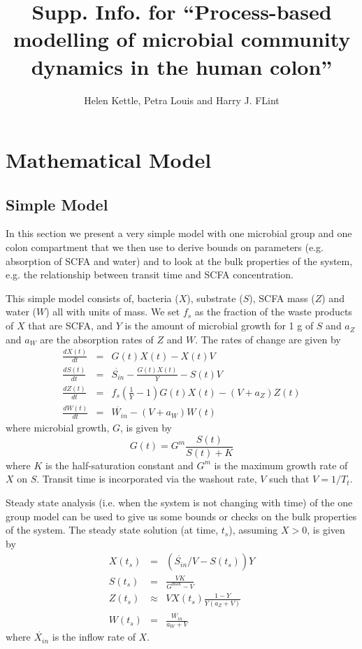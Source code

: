 \documentclass[a4paper]{article}
\begin{document}
\title{Supp. Info. for ``Process-based modelling of microbial community dynamics in the human colon''}

\author{Helen Kettle, Petra Louis and Harry J. FLint}

\maketitle

\linenumbers

\section{Mathematical Model}
\subsection{Simple Model}
In this section we present a very simple model with one microbial group and one colon compartment that we then use to derive bounds on parameters (e.g. absorption of SCFA and water) and to look at the bulk properties of the system, e.g. the relationship between transit time and SCFA concentration.

This simple model consists of, bacteria ($X$), substrate ($S$), SCFA mass ($Z$) and water ($W$) all with units of mass. We set $f_s$ as the fraction of the waste products of $X$ that are SCFA, and $Y$ is the amount of microbial growth for 1 g of $S$ and $a_Z$ and $a_W$ are the absorption rates of $Z$ and $W$.
The rates of change are given by
\begin{eqnarray}
\frac{dX(t)}{dt}&=&G(t)X(t)-X(t)V\\\label{eq:TtSSB}
\frac{dS(t)}{dt}&=&\dot{S_{in}}-\frac{G(t)X(t)}{Y}-S(t)V\\
\frac{dZ(t)}{dt}&=&f_s\left(\frac{1}{Y}-1\right)G(t)X(t)-(V+a_Z)Z(t)\\
\frac{dW(t)}{dt}&=&\dot{W_{in}}-(V+a_W)W(t)\label{eq:TtSSW}
\end{eqnarray}
where microbial growth, $G$, is given by
\begin{equation}
G(t)=G^m\frac{S(t)}{S(t)+K}
\end{equation}
where $K$ is the half-saturation constant and $G^m$ is the maximum growth rate of $X$ on $S$.
Transit time is incorporated via the washout rate, $V$ such that $V=1/T_t$.

Steady state analysis (i.e. when the system is not changing with time) of the one group model can be used to give us some bounds or checks on the bulk properties of the system. 
The steady state solution (at time, $t_s$), assuming $X>0$, is given by 
\begin{eqnarray}
X(t_s)&=&(\dot{S_{in}}/V-S(t_s))Y\\
S(t_s)&=&\frac{VK}{G^{\max}-V}\\
Z(t_s)&\approx & VX(t_s)\frac{1-Y}{Y(a_Z+V)}\\
W(t_s)&=&\frac{\dot{W_{in}}}{a_W+V}\label{eq:Wss1}
\end{eqnarray}
where $\dot{X_{in}}$ is the inflow rate of $X$.
\end{document}
